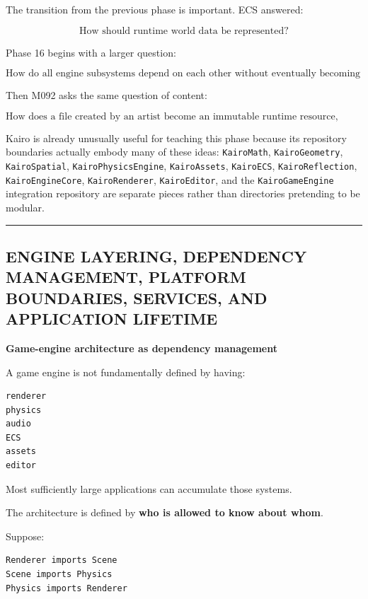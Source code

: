 The transition from the previous phase is important. ECS answered:

\[
\text{How should runtime world data be represented?}
\]

Phase 16 begins with a larger question:

\[
\boxed{
\text{How do all engine subsystems depend on each other without eventually becoming one inseparable program?}
}
\]

Then M092 asks the same question of content:

\[
\boxed{
\text{How does a file created by an artist become an immutable runtime resource,
while remaining reproducible, reloadable, cacheable and safe for the GPU?}
}
\]

Kairo is already unusually useful for teaching this phase because its repository boundaries actually embody many of these ideas: \texttt{KairoMath}, \texttt{KairoGeometry}, \texttt{KairoSpatial}, \texttt{KairoPhysicsEngine}, \texttt{KairoAssets}, \texttt{KairoECS}, \texttt{KairoReflection}, \texttt{KairoEngineCore}, \texttt{KairoRenderer}, \texttt{KairoEditor}, and the \texttt{KairoGameEngine} integration repository are separate pieces rather than directories pretending to be modular.

\begin{center}\rule{0.5\linewidth}{0.5pt}\end{center}

\subsection{ENGINE LAYERING, DEPENDENCY MANAGEMENT, PLATFORM BOUNDARIES, SERVICES, AND APPLICATION LIFETIME}\label{05-engine-i-ch010-engine-layering-dependency-management-platform-boundaries-services-and-application-lifetime}

\textbf{Game-engine architecture as dependency management}

A game engine is not fundamentally defined by having:

\begin{verbatim}
renderer
physics
audio
ECS
assets
editor
\end{verbatim}

Most sufficiently large applications can accumulate those systems.

The architecture is defined by \textbf{who is allowed to know about whom}.

Suppose:

\begin{verbatim}
Renderer imports Scene
Scene imports Physics
Physics imports Renderer
\end{verbatim}

